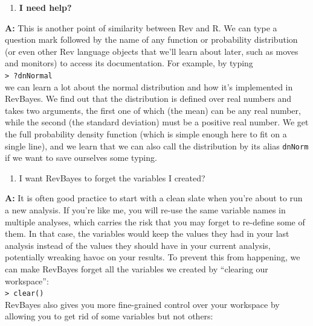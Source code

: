 \documentclass[12pt]{article}
\begin{document}
{\large
\begin{enumerate}\bfseries
\item \textbf{I need help?}
\end{enumerate}
}

\noindent \textbf{A:} This is another point of similarity between Rev and \textsf{R}. We can type a question mark followed by the name of any function or probability distribution (or even other Rev language objects that we'll learn about later, such as moves and monitors) to access its documentation. For example, by typing \\

\indent \texttt{> ?dnNormal} \\

\noindent we can learn a lot about the normal distribution and how it's implemented in RevBayes. We find out that the distribution is defined over real numbers and takes two arguments, the first one of which (the mean) can be any real number, while the second (the standard deviation) must be a positive real number. We get the full probability density function (which is simple enough here to fit on a single line), and we learn that we can also call the distribution by its alias \texttt{dnNorm} if we want to save ourselves some typing. \\

{\large
\begin{enumerate}\bfseries
\setcounter{enumi}{1}
\item I want RevBayes to forget the variables I created?
\end{enumerate}
}

\noindent \textbf{A:} It is often good practice to start with a clean slate when you're about to run a new analysis. If you're like me, you will re-use the same variable names in multiple analyses, which carries the risk that you may forget to re-define some of them. In that case, the variables would keep the values they had in your last analysis instead of the values they should have in your current analysis, potentially wreaking havoc on your results. To prevent this from happening, we can make RevBayes forget all the variables we created by ``clearing our workspace'': \\

\indent \texttt{> clear()} \\

\noindent RevBayes also gives you more fine-grained control over your workspace by allowing you to get rid of some variables but not others: \\
\end{document}
